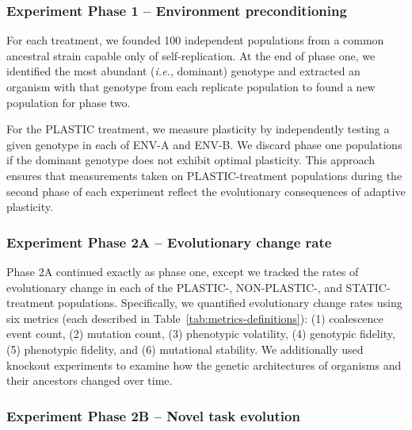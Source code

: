 \vspace{5mm}
\subsubsection{Experiment Phase 1 -- Environment preconditioning}
\label{sec:methods:experiment:phase-one}

For each treatment, we founded 100 independent populations from a common ancestral strain capable only of self-replication.
At the end of phase one, we identified the most abundant (\textit{i.e.}, dominant) genotype and extracted an organism with that genotype from each replicate population to found a new population for phase two.

For the PLASTIC treatment, we measure plasticity by independently testing a given genotype in each of ENV-A and ENV-B.
We discard phase one populations if the dominant genotype does not exhibit optimal plasticity.
This approach ensures that measurements taken on PLASTIC-treatment populations during the second phase of each experiment reflect the evolutionary consequences of adaptive plasticity.

\vspace{5mm}
\subsubsection{Experiment Phase 2A -- Evolutionary change rate}
\label{sec:methods:exp:evolutionary-change-rate}

Phase 2A continued exactly as phase one, except we tracked the rates of evolutionary change in each of the PLASTIC-, NON-PLASTIC-, and STATIC-treatment populations. 
Specifically, we quantified evolutionary change rates using six metrics (each described in Table~\ref{tab:metrics-definitions}):
(1) coalescence event count,
(2) mutation count, 
(3) phenotypic volatility,
(4) genotypic fidelity, 
(5) phenotypic fidelity,
and (6) mutational stability.
We additionally used knockout experiments to examine how the genetic architectures of organisms and their ancestors changed over time.

\vspace{3mm}
\subsubsection{Experiment Phase 2B -- Novel task evolution}
\label{sec:methods:exp:novel-task-evolution}

